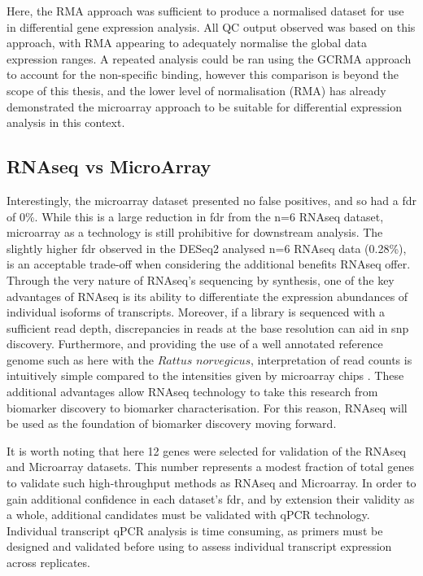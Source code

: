 Here, the RMA approach was sufficient to produce a normalised dataset for use in differential gene expression analysis. All QC output observed was based on this approach, with RMA appearing to adequately normalise the global data expression ranges. A repeated analysis could be ran using the GCRMA approach to account for the non-specific binding, however this comparison is beyond the scope of this thesis, and the lower level of normalisation (RMA) has already demonstrated the microarray approach to be suitable for differential expression analysis in this context.

\subsection{RNAseq vs MicroArray} \label{RNAseq vs MicroArray}

Interestingly, the microarray dataset presented no false positives, and so had a \acrshort{fdr} of 0\%. While this is a large reduction in \acrshort{fdr} from the n=6 RNAseq dataset, microarray as a technology is still prohibitive for downstream analysis. The slightly higher \acrshort{fdr} observed in the DESeq2 analysed n=6 RNAseq data (0.28\%), is an acceptable trade-off when considering the additional benefits RNAseq offer. Through the very nature of RNAseq's sequencing by synthesis, one of the key advantages of RNAseq is its ability to differentiate the expression abundances of individual isoforms of transcripts. Moreover, if a library is sequenced with a sufficient read depth, discrepancies in reads at the base resolution can aid in \acrfull{snp} discovery. Furthermore, and providing the use of a well annotated reference genome such as here with the $\textit{Rattus norvegicus}$, interpretation of read counts is intuitively simple compared to the intensities given by microarray chips \cite{10.1371/journal.pone.0190152}. These additional advantages allow RNAseq technology to take this research from biomarker discovery to biomarker characterisation. For this reason, RNAseq will be used as the foundation of biomarker discovery moving forward. 

It is worth noting that here 12 genes were selected for validation of the RNAseq and Microarray datasets. This number represents a modest fraction of total genes to validate such high-throughput methods as RNAseq and Microarray. In order to gain additional confidence in each dataset's \acrshort{fdr}, and by extension their validity as a whole, additional candidates must be validated with qPCR technology. Individual transcript qPCR analysis is time consuming, as primers must be designed and validated before using to assess individual transcript expression across replicates.

